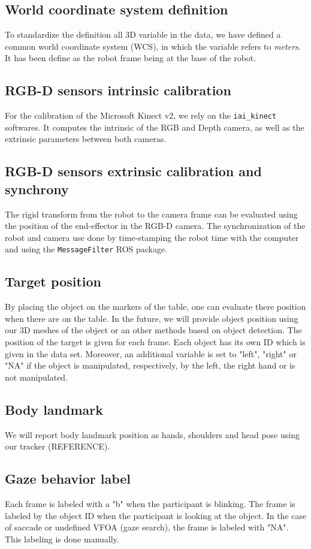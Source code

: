 \documentclass[11pt,a4paper]{article}
\begin{document}
\subsection{World coordinate system definition}
To standardize the definition all 3D variable in the data, we have defined a common world coordinate system (WCS), in which the variable refers to \textit{meters}. It has been define as the robot frame being at the base of the robot.

\subsection{RGB-D sensors intrinsic calibration}
For the calibration of the Microsoft Kinect v2, we rely on the \texttt{iai\_kinect} softwares. It computes the intrinsic of the RGB and Depth camera, as well as the extrinsic parameters between both cameras.

\subsection{RGB-D sensors extrinsic calibration and synchrony}
The rigid transform from the robot to the camera frame can be evaluated using the position of the end-effector in the RGB-D camera. The synchronization of the robot and camera use done by time-stamping the robot time with the computer and using the \texttt{MessageFilter} ROS package.

\subsection{Target position}
By placing the object on the markers of the table, one can evaluate there position when there are on the table. In the future, we will provide object position using our 3D meshes of the object or an other methods based on object detection. The position of the target is given for each frame. Each object has its own ID which is given in the data set. Moreover, an additional variable is set to "left", "right" or "NA" if the object is manipulated, respectively, by the left, the right hand or is not manipulated.

\subsection{Body landmark}
We will report body landmark position as hands, shoulders and head pose using our tracker (REFERENCE).

\subsection{Gaze behavior label}
Each frame is labeled with a "b" when the participant is blinking. The frame is labeled by the object ID when the participant is looking at the object. In the case of saccade or undefined VFOA (gaze search), the frame is labeled with "NA". This labeling is done manually.
\end{document}
